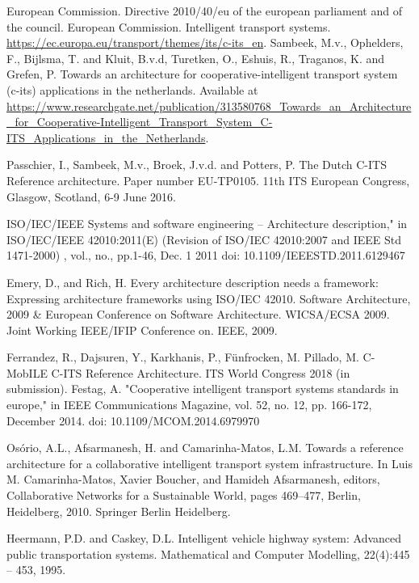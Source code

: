 \documentclass[conference]{IEEEtran}
\begin{document}
\begin{thebibliography}{00}

     European Commission. Directive 2010/40/eu of the european parliament and of the council.
     European Commission. Intelligent transport systems. \url{https://ec.europa.eu/transport/themes/its/c-its_en}.
     Sambeek, M.v., Ophelders, F., Bijlsma, T. and Kluit, B.v.d, Turetken, O., Eshuis, R., Traganos, K. and Grefen, P. Towards an architecture for cooperative-intelligent transport system (c-its) applications in the netherlands. Available at \url{ https://www.researchgate.net/publication/313580768_Towards_an_Architecture_for_Cooperative-Intelligent_Transport_System_C-ITS_Applications_in_the_Netherlands}.

	 Passchier, I., Sambeek, M.v., Broek, J.v.d. and Potters, P. The Dutch C-ITS Reference architecture. Paper number EU-TP0105. 11th ITS European Congress, Glasgow, Scotland, 6-9 June 2016.

     ISO/IEC/IEEE Systems and software engineering -- Architecture description," in ISO/IEC/IEEE 42010:2011(E) (Revision of ISO/IEC 42010:2007 and IEEE Std 1471-2000) , vol., no., pp.1-46, Dec. 1 2011 doi: 10.1109/IEEESTD.2011.6129467
    
    Emery, D., and Rich, H. Every architecture description needs a framework: Expressing architecture frameworks using ISO/IEC 42010. Software Architecture, 2009 \& European Conference on Software Architecture. WICSA/ECSA 2009. Joint Working IEEE/IFIP Conference on. IEEE, 2009.
    
     Ferrandez, R., Dajsuren, Y., Karkhanis, P., Fünfrocken, M. Pillado, M. C-MobILE C-ITS Reference Architecture. ITS World Congress 2018 (in submission).
     Festag, A. "Cooperative intelligent transport systems standards in europe," in IEEE Communications Magazine, vol. 52, no. 12, pp. 166-172, December 2014.  doi: 10.1109/MCOM.2014.6979970
    
     Osório, A.L., Afsarmanesh, H. and Camarinha-Matos, L.M. Towards a reference architecture
    for a collaborative intelligent transport system infrastructure. In Luis M. Camarinha-Matos, Xavier Boucher, and Hamideh Afsarmanesh, editors, Collaborative Networks for a Sustainable
    World, pages 469–477, Berlin, Heidelberg, 2010. Springer Berlin Heidelberg.
    
     Heermann, P.D. and Caskey, D.L. Intelligent vehicle highway system: Advanced public transportation
    systems. Mathematical and Computer Modelling, 22(4):445 – 453, 1995.
    

\end{thebibliography}
\end{document}
